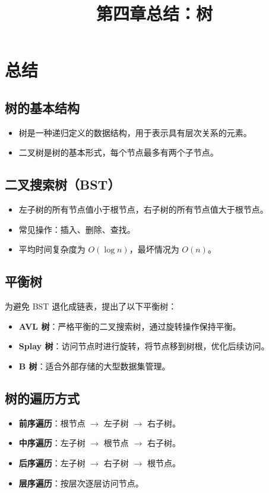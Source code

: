 \documentclass[a4paper,12pt]{article}
\title{第四章总结：树}
\author{}
\date{}
\begin{document}
\maketitle

\section*{总结}

\subsection*{树的基本结构}
\begin{itemize}
    \item 树是一种递归定义的数据结构，用于表示具有层次关系的元素。
    \item 二叉树是树的基本形式，每个节点最多有两个子节点。
\end{itemize}

\subsection*{二叉搜索树（BST）}
\begin{itemize}
    \item 左子树的所有节点值小于根节点，右子树的所有节点值大于根节点。
    \item 常见操作：插入、删除、查找。
    \item 平均时间复杂度为 $O(\log n)$，最坏情况为 $O(n)$。
\end{itemize}

\subsection*{平衡树}
为避免 BST 退化成链表，提出了以下平衡树：
\begin{itemize}
    \item \textbf{AVL 树}：严格平衡的二叉搜索树，通过旋转操作保持平衡。
    \item \textbf{Splay 树}：访问节点时进行旋转，将节点移到树根，优化后续访问。
    \item \textbf{B 树}：适合外部存储的大型数据集管理。
\end{itemize}

\subsection*{树的遍历方式}
\begin{itemize}
    \item \textbf{前序遍历}：根节点 $\rightarrow$ 左子树 $\rightarrow$ 右子树。
    \item \textbf{中序遍历}：左子树 $\rightarrow$ 根节点 $\rightarrow$ 右子树。
    \item \textbf{后序遍历}：左子树 $\rightarrow$ 右子树 $\rightarrow$ 根节点。
    \item \textbf{层序遍历}：按层次逐层访问节点。
\end{itemize}
\end{document}
